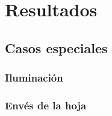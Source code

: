\chapter{Resultados}

\section{Casos especiales}
\subsection{Iluminación}
\subsection{Envés de la hoja}
